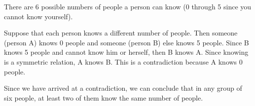 \documentclass[solution, letterpaper]{cs20exam}
\begin{document}
\begin{solution}

There are 6 possible numbers of people a person can know (0 through 5 since you cannot know yourself).

Suppose that each person knows a different number of people. Then someone (person A) knows 0 people and someone (person B) else knows 5 people. Since B knows 5 people and cannot know him or herself, then B knows A. Since knowing is a symmetric relation, A knows B. This is a contradiction because A knows 0 people.

Since we have arrived at a contradiction, we can conclude that in any group of six people, at least two of them know the same number of people.

\end{solution}
\end{document}
